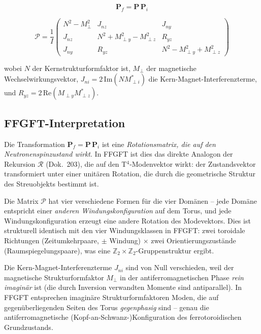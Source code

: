 \begin{equation}
  \mathbf{P}_f = \mathbf{P}\,\mathbf{P}_i
  \tag{Ref.~Gl.~2}
\end{equation}

\begin{equation}
  \mathcal{P} = \frac{1}{I}
  \begin{pmatrix}
    N^2 - M_\perp^2 & J_{nz} & J_{ny} \\
    J_{nz} & N^2 + M_{\perp y}^2 - M_{\perp z}^2 & R_{yz} \\
    J_{ny} & R_{yz} & N^2 - M_{\perp y}^2 + M_{\perp z}^2
  \end{pmatrix}
  \tag{Ref.~Gl.~3}
\end{equation}

\noindent wobei $N$ der Kernstrukturformfaktor ist, $M_\perp$ der magnetische
Wechselwirkungsvektor, $J_{ni} = 2\,\mathrm{Im}(NM_{\perp i}^*)$ die
Kern-Magnet-Interferenzterme, und $R_{yz} = 2\,\mathrm{Re}(M_{\perp y}M_{\perp z}^*)$.

\subsection*{FFGFT-Interpretation}

Die Transformation $\mathbf{P}_f = \mathbf{P}\,\mathbf{P}_i$ ist eine
\emph{Rotationsmatrix, die auf den Neutronenspinzustand wirkt}. In FFGFT
ist dies das direkte Analogon der Rekursion $\mathcal{R}$ (Dok.~203), die
auf den T$^4$-Modenvektor wirkt: der Zustandsvektor transformiert unter
einer unitären Rotation, die durch die geometrische Struktur des Streuobjekts
bestimmt ist.

Die Matrix $\mathcal{P}$ hat vier verschiedene Formen für die vier Domänen --
jede Domäne entspricht einer \emph{anderen Windungskonfiguration} auf dem
Torus, und jede Windungskonfiguration erzeugt eine andere Rotation des
Modevektors. Dies ist strukturell identisch mit den vier Windungsklassen
in FFGFT: zwei toroidale Richtungen (Zeitumkehrpaare, $\pm$ Windung)
$\times$ zwei Orientierungszustände (Raumspiegelungspaare), was eine
$\mathbb{Z}_2 \times \mathbb{Z}_2$-Gruppenstruktur ergibt.

Die Kern-Magnet-Interferenzterme $J_{ni}$ sind von Null verschieden, weil der
magnetische Strukturformfaktor $M_\perp$ in der antiferromagnetischen Phase
\emph{rein imaginär} ist (die durch Inversion verwandten Momente sind
antiparallel). In FFGFT entsprechen imaginäre Strukturformfaktoren Moden, die
auf gegenüberliegenden Seiten des Torus \emph{gegenphasig} sind -- genau die
antiferromagnetische (Kopf-an-Schwanz-)Konfiguration des ferrotoroidischen
Grundzustands.

